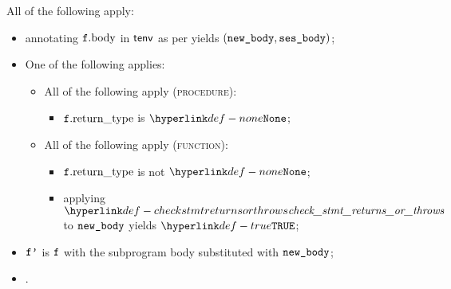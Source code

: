 \ProseParagraph
All of the following apply:
\begin{itemize}
  \item annotating $\vf.\funcbody$ in $\tenv$ as per  yields $(\newbody, \vsesbody)$\ProseOrTypeError;
  \item One of the following applies:
  \begin{itemize}
    \item All of the following apply (\textsc{procedure}):
    \begin{itemize}
      \item $\vf.\funcreturntype$ is $\None$;
    \end{itemize}

    \item All of the following apply (\textsc{function}):
    \begin{itemize}
      \item $\vf.\funcreturntype$ is not $\None$;
      \item applying $\checkstmtreturnsorthrows$ to $\newbody$ yields $\True$\ProseOrTypeError;
    \end{itemize}
  \end{itemize}
  \item $\vfp$ is $\vf$ with the subprogram body substituted with $\newbody$;
  \item {}.
\end{itemize}

\FormallyParagraph
\begin{mathpar}
\end{mathpar}

